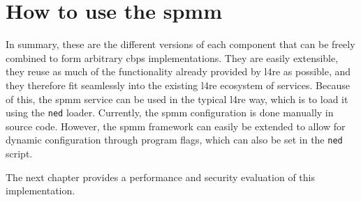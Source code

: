 \section{How to use the \acs{spmm}}
\label{sec:how-to-use-the-spmm}

In summary, these are the different versions of each component that can be freely combined to form arbitrary \ac{cbps} implementations.
They are easily extensible, they reuse as much of the functionality already provided by \ac{l4re} as possible, and they therefore fit seamlessly into the existing \ac{l4re} ecosystem of services.
Because of this, the \ac{spmm} service can be used in the typical \ac{l4re} way, which is to load it using the \texttt{ned} loader.
Currently, the \ac{spmm} configuration is done manually in source code.
However, the \ac{spmm} framework can easily be extended to allow for dynamic configuration through program flags, which can also be set in the \texttt{ned} script.

The next chapter provides a performance and security evaluation of this implementation.
